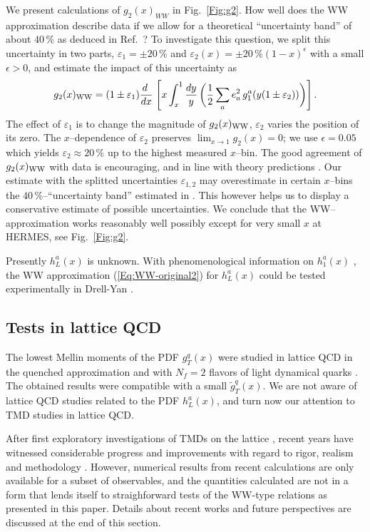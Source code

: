 \documentclass[a4paper,11pt]{article}
\newcommand{\be}{\begin{equation}}
\newcommand{\ee}{\end{equation}}
\begin{document}
We present calculations of $g_2(x)_{WW}$ in Fig.~\ref{Fig:g2}.
How well does the WW approximation describe data if we allow for a
theoretical ``uncertainty band'' of about $40\,\%$ as deduced in Ref.~\cite{Accardi:2009au}? To investigate this question, 
we split this uncertainty in two parts, $\varepsilon_1=\pm 20\,\%$ and 
$\varepsilon_2(x)=\pm 20\,\%(1-x)^\epsilon$ with a small $\epsilon>0$,
and estimate the impact of this uncertainty as 
\be\label{Eq:g2-in-WW-model-violation}
    g_2(x)_{\rm WW} = (1\pm\varepsilon_1)\frac{ d\;}{ d x}\;\Biggl[
    x\int_x^1\frac{ d y}{y} \,\biggl(
    \frac12\sum_ae_a^2\,g_1^a(y(1\pm\varepsilon_2))\biggr)\Biggr]\,.
\ee
The effect of $\varepsilon_1$ is to change the magnitude
of $g_2(x)_{\rm WW}$, $\varepsilon_2$ varies the position of its zero.
The $x$--dependence of $\varepsilon_2$ preserves $\lim_{x\to1}g_2(x)= 0$; 
we use $\epsilon=0.05$ which yields $\varepsilon_2\approx 20\,\%$ up to 
the highest measured $x$--bin.
The good agreement of $g_2(x)_{\rm WW}$ with data is encouraging,
and in line with theory predictions \cite{Balla:1997hf}.
Our estimate with the splitted uncertainties 
$\varepsilon_{1,2}$ may overestimate in certain $x$--bins the 
$40\,\%$--``uncertainty band'' estimated in \cite{Accardi:2009au}. 
This however helps us to display a conservative estimate of possible 
uncertainties. 
We conclude that the WW--approximation works reasonably well
possibly except for very small $x$ at HERMES, see Fig.~\ref{Fig:g2}.

Presently $h_L^a(x)$ is unknown.
With phenomenological information on $h_1^a(x)$
\cite{Efremov:2006qm,Anselmino:2007fs,Anselmino:2008jk}, 
the WW approximation (\ref{Eq:WW-original2}) for $h_L^a(x)$ could 
be tested experimentally in Drell-Yan \cite{Koike:2008du}.


\subsection{Tests in lattice QCD}
\label{Sec-3.5:WW-lattice}

The lowest Mellin moments of the PDF $g_T^q(x)$ were studied in
lattice QCD in the quenched approximation \cite{Gockeler:2000ja} 
and with $N_f = 2$ flavors of light dynamical quarks \cite{Gockeler:2005vw}.
The obtained results were compatible with a small $\tilde{g}_T^q(x)$. 
We are not aware of lattice QCD studies related to the PDF $h_L^a(x)$,
and turn now our attention to TMD studies in lattice QCD.

After first exploratory investigations of TMDs on the lattice
\cite{Hagler:2009mb,Musch:2010ka}, recent years have witnessed considerable
progress and improvements with regard to rigor, realism and methodology
\cite{Yoon:2017qzo, %
Engelhardt:2015xja,%
Ji:2014hxa,%
Musch:2011er%
}.
However, numerical results from recent calculations are only available 
for a subset of observables, and the quantities calculated are not in a 
form that lends itself to straighforward tests of the WW-type relations 
as presented in this paper. Details about recent works and future 
perspectives are discussed at the end of this section.
\end{document}
